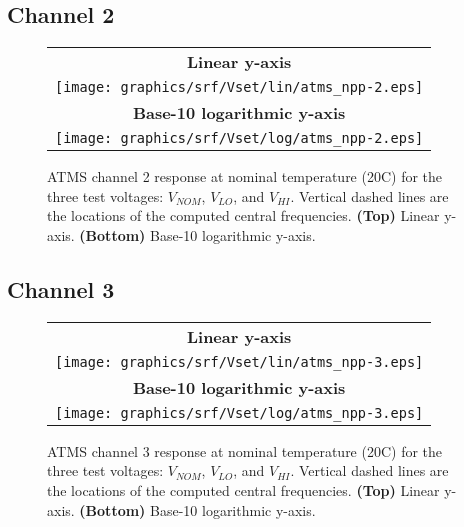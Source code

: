 \subsection{Channel 2}
\begin{figure}[H]
  \label{fig:Vset.ch2_response}
  \centering
  \begin{tabular}{c}
    \hspace{1.75cm}\sffamily\textbf{Linear y-axis} \\
    \texttt{[image: graphics/srf/Vset/lin/atms\_npp-2.eps]} \\
    \hspace{1.75cm}\sffamily\textbf{Base-10 logarithmic y-axis} \\
    \texttt{[image: graphics/srf/Vset/log/atms\_npp-2.eps]}
  \end{tabular}
  \caption{ATMS channel 2 response at nominal temperature (20\textdegree{}C) for the three test voltages: $V_{NOM}$, $V_{LO}$, and $V_{HI}$. Vertical dashed lines are the locations of the computed central frequencies. \textbf{(Top)} Linear y-axis. \textbf{(Bottom)} Base-10 logarithmic y-axis.}
\end{figure}

\subsection{Channel 3}
\begin{figure}[H]
  \label{fig:Vset.ch3_response}
  \centering
  \begin{tabular}{c}
    \hspace{1.75cm}\sffamily\textbf{Linear y-axis} \\
    \texttt{[image: graphics/srf/Vset/lin/atms\_npp-3.eps]} \\
    \hspace{1.75cm}\sffamily\textbf{Base-10 logarithmic y-axis} \\
    \texttt{[image: graphics/srf/Vset/log/atms\_npp-3.eps]}
  \end{tabular}
  \caption{ATMS channel 3 response at nominal temperature (20\textdegree{}C) for the three test voltages: $V_{NOM}$, $V_{LO}$, and $V_{HI}$. Vertical dashed lines are the locations of the computed central frequencies. \textbf{(Top)} Linear y-axis. \textbf{(Bottom)} Base-10 logarithmic y-axis.}
\end{figure}


